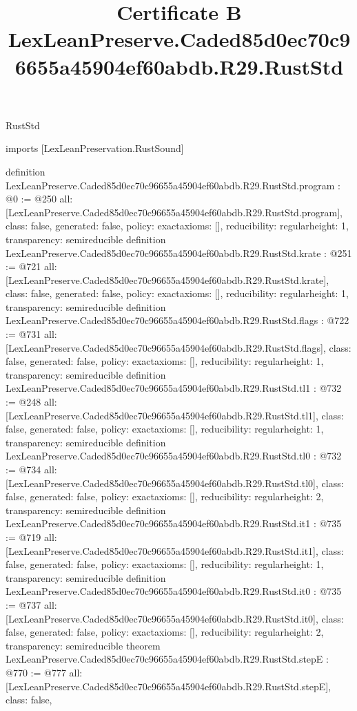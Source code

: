 \begin{lexlean}{RustStd}
\title{Certificate B LexLeanPreserve.Caded85d0ec70c96655a45904ef60abdb.R29.RustStd}
\begin{coremodule}
imports [LexLeanPreservation.RustSound]

definition LexLeanPreserve.Caded85d0ec70c96655a45904ef60abdb.R29.RustStd.program : @0 := @250 {
  all: [LexLeanPreserve.Caded85d0ec70c96655a45904ef60abdb.R29.RustStd.program],
  class: false,
  generated: false,
  policy: exact{axioms: []},
  reducibility: regular{height: 1},
  transparency: semireducible
}
definition LexLeanPreserve.Caded85d0ec70c96655a45904ef60abdb.R29.RustStd.krate : @251 := @721 {
  all: [LexLeanPreserve.Caded85d0ec70c96655a45904ef60abdb.R29.RustStd.krate],
  class: false,
  generated: false,
  policy: exact{axioms: []},
  reducibility: regular{height: 1},
  transparency: semireducible
}
definition LexLeanPreserve.Caded85d0ec70c96655a45904ef60abdb.R29.RustStd.flags : @722 := @731 {
  all: [LexLeanPreserve.Caded85d0ec70c96655a45904ef60abdb.R29.RustStd.flags],
  class: false,
  generated: false,
  policy: exact{axioms: []},
  reducibility: regular{height: 1},
  transparency: semireducible
}
definition LexLeanPreserve.Caded85d0ec70c96655a45904ef60abdb.R29.RustStd.tl1 : @732 := @248 {
  all: [LexLeanPreserve.Caded85d0ec70c96655a45904ef60abdb.R29.RustStd.tl1],
  class: false,
  generated: false,
  policy: exact{axioms: []},
  reducibility: regular{height: 1},
  transparency: semireducible
}
definition LexLeanPreserve.Caded85d0ec70c96655a45904ef60abdb.R29.RustStd.tl0 : @732 := @734 {
  all: [LexLeanPreserve.Caded85d0ec70c96655a45904ef60abdb.R29.RustStd.tl0],
  class: false,
  generated: false,
  policy: exact{axioms: []},
  reducibility: regular{height: 2},
  transparency: semireducible
}
definition LexLeanPreserve.Caded85d0ec70c96655a45904ef60abdb.R29.RustStd.it1 : @735 := @719 {
  all: [LexLeanPreserve.Caded85d0ec70c96655a45904ef60abdb.R29.RustStd.it1],
  class: false,
  generated: false,
  policy: exact{axioms: []},
  reducibility: regular{height: 1},
  transparency: semireducible
}
definition LexLeanPreserve.Caded85d0ec70c96655a45904ef60abdb.R29.RustStd.it0 : @735 := @737 {
  all: [LexLeanPreserve.Caded85d0ec70c96655a45904ef60abdb.R29.RustStd.it0],
  class: false,
  generated: false,
  policy: exact{axioms: []},
  reducibility: regular{height: 2},
  transparency: semireducible
}
theorem LexLeanPreserve.Caded85d0ec70c96655a45904ef60abdb.R29.RustStd.stepE : @770 := @777 {
  all: [LexLeanPreserve.Caded85d0ec70c96655a45904ef60abdb.R29.RustStd.stepE],
  class: false,
}
\end{coremodule}
\end{lexlean}
